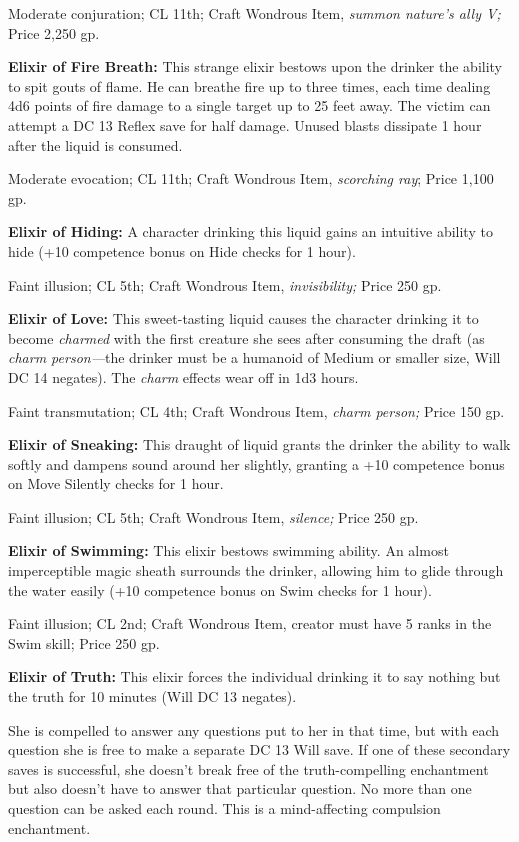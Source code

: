 \documentclass{article}
\begin{document}
Moderate conjuration; CL 11th; Craft Wondrous Item, \textit{summon nature's ally 
V; }Price 2,250 gp.

\textbf{Elixir of Fire Breath: }This strange elixir bestows upon the drinker the 
ability to spit gouts of flame. He can breathe fire up to three times, each time 
dealing 4d6 points of fire damage to a single target up to 25 feet away. The victim 
can attempt a DC 13 Reflex save for half damage. Unused blasts dissipate 1 hour 
after the liquid is consumed.

Moderate evocation; CL 11th; Craft Wondrous Item, \textit{scorching ray}; Price 
1,100 gp.

\textbf{Elixir of Hiding:} A character drinking this liquid gains an intuitive 
ability to hide (+10 competence bonus on Hide checks for 1 hour).

Faint illusion; CL 5th; Craft Wondrous Item, \textit{invisibility; }Price 250 gp.

\textbf{Elixir of Love:} This sweet-tasting liquid causes the character drinking 
it to become \textit{charmed }with the first creature she sees after consuming 
the draft (as \textit{charm person---}the drinker must be a humanoid of Medium 
or smaller size, Will DC 14 negates). The \textit{charm }effects wear off in 1d3 
hours.

Faint transmutation; CL 4th; Craft Wondrous Item, \textit{charm person; }Price 
150 gp.

\textbf{Elixir of Sneaking:} This draught of liquid grants the drinker the ability 
to walk softly and dampens sound around her slightly, granting a +10 competence 
bonus on Move Silently checks for 1 hour.

Faint illusion; CL 5th; Craft Wondrous Item, \textit{silence; }Price 250 gp.

\textbf{Elixir of Swimming:} This elixir bestows swimming ability. An almost imperceptible 
magic sheath surrounds the drinker, allowing him to glide through the water easily 
(+10 competence bonus on Swim checks for 1 hour).

Faint illusion; CL 2nd; Craft Wondrous Item, creator must have 5 ranks in the Swim 
skill; Price 250 gp.

\textbf{Elixir of Truth: }This elixir forces the individual drinking it to say 
nothing but the truth for 10 minutes (Will DC 13 negates).

She is compelled to answer any questions put to her in that time, but with each 
question she is free to make a separate DC 13 Will save. If one of these secondary 
saves is successful, she doesn't break free of the truth-compelling enchantment 
but also doesn't have to answer that particular question. No more than one question 
can be asked each round. This is a mind-affecting compulsion enchantment.
\end{document}
